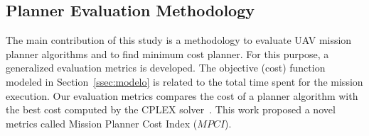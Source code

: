 \documentclass[conference]{IEEEtran}
\begin{document}
%
%
%
%
%
%
%
\subsection{Planner Evaluation Methodology}
\label{ssec:evaluationmethod}

The main contribution of this study is a methodology to evaluate UAV mission planner algorithms and to find minimum cost planner. For this purpose, a generalized evaluation metrics is developed. The objective (cost) function modeled in Section~\ref{ssec:modelo} is related to the total time spent for the mission execution. Our evaluation metrics compares the cost of a planner algorithm with the best cost computed by the CPLEX solver~\cite{cplex2003ilog}. This work proposed a novel metrics called Mission Planner Cost Index ($MPCI$).
\end{document}
